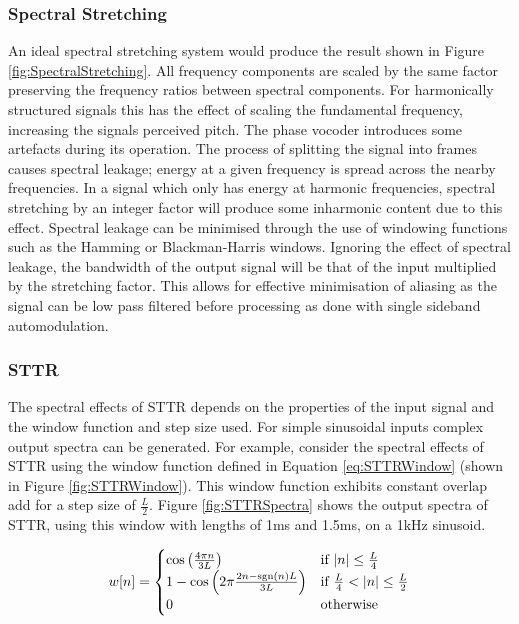 		\subsubsection*{Spectral Stretching}
			An ideal spectral stretching system would produce the result shown in Figure
			\ref{fig:SpectralStretching}. All frequency components are scaled by the same factor preserving the
			frequency ratios between spectral components. For harmonically structured signals this has the
			effect of scaling the fundamental frequency, increasing the signals perceived pitch. The phase
			vocoder introduces some artefacts during its operation. The process of splitting the signal into
			frames causes spectral leakage; energy at a given frequency is spread across the nearby
			frequencies.  In a signal which only has energy at harmonic frequencies, spectral stretching by an
			integer factor will produce some inharmonic content due to this effect. Spectral leakage can be
			minimised through the use of windowing functions such as the Hamming or Blackman-Harris windows.
			Ignoring the effect of spectral leakage, the bandwidth of the output signal will be that of the
			input multiplied by the stretching factor. This allows for effective minimisation of aliasing as
			the signal can be low pass filtered before processing as done with single sideband automodulation.
		
		\subsubsection*{STTR}
			The spectral effects of STTR depends on the properties of the input signal and the window function
			and step size used. For simple sinusoidal inputs complex output spectra can be generated. For
			example, consider the spectral effects of STTR using the window function defined in Equation
			\ref{eq:STTRWindow} (shown in Figure \ref{fig:STTRWindow}). This window function exhibits constant
			overlap add for a step size of $\frac{L}{2}$. Figure \ref{fig:STTRSpectra} shows the output spectra
			of STTR, using this window with lengths of 1ms and 1.5ms, on a 1kHz sinusoid.

			\begin{equation}
				w[n] = \begin{cases}
					\cos \left( \frac{4\pi n}{3L} \right) & \text{if $\left|n\right| \leq \frac{L}{4} $} \\
					1 - \cos \left( 2\pi \frac{2n - \operatorname{sgn}(n)L}{3L} \right) &
						\text{if $\frac{L}{4} < \left|n\right| \leq \frac{L}{2}$} \\
					0 & \text{otherwise}
				\end{cases}
				\label{eq:STTRWindow}
			\end{equation}

